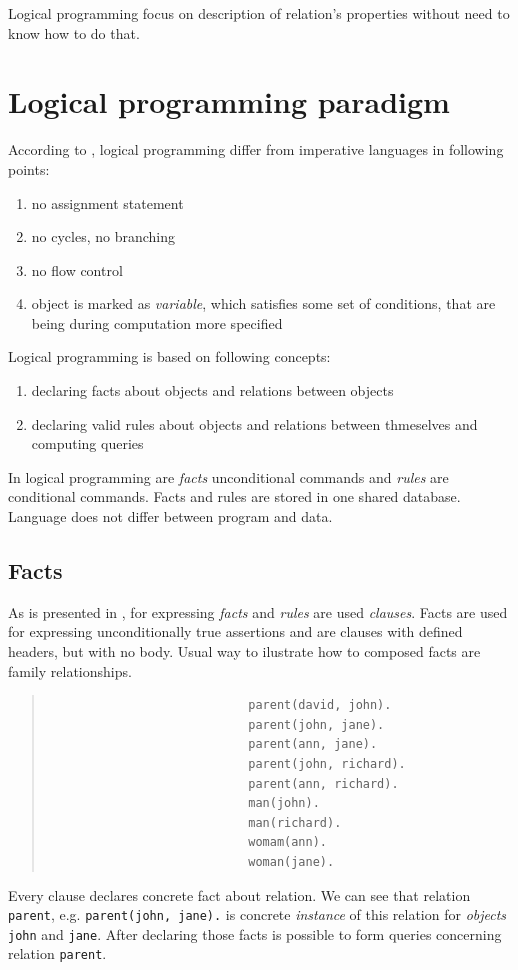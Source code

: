 \documentclass[11pt,twoside,a4paper]{book}
\begin{document}
Logical programming focus on description of relation's properties without need
to know how to do that.

\section{Logical programming paradigm}

According to \cite{nino:pls}, logical programming differ from imperative
languages in following points:
\begin{enumerate}
  \item no assignment statement
  \item no cycles, no branching 
  \item no flow control
  \item object is marked as \textit{variable}, which satisfies some set of
  conditions, that are being during computation more specified
\end{enumerate}
Logical programming is based on following concepts:
\begin{enumerate}
  \item declaring facts about objects and relations between objects
  \item declaring valid rules about objects and relations between thmeselves and
  computing queries
\end{enumerate}
In logical programming are \textit{facts} unconditional commands and
\textit{rules} are conditional commands. Facts and rules are stored in one
shared database. Language does not differ between program and data.

\newpage
\subsection{Facts}
\label{sec:facts}
As is presented in \cite{jirku:progProlog}, for expressing \textit{facts} and
\textit{rules} are used \textit{clauses}. Facts are used for expressing unconditionally true assertions and are clauses
with defined headers, but with no body. Usual way to ilustrate how to
composed facts are family relationships.

\begin{quote}
\begin{verbatim}
                            parent(david, john).
                            parent(john, jane).
                            parent(ann, jane).
                            parent(john, richard).
                            parent(ann, richard).
                            man(john).
                            man(richard).
                            womam(ann).
                            woman(jane).
\end{verbatim}
\end{quote}
Every clause declares concrete fact about relation. We can see that relation
\verb|parent|, e.g. \verb|parent(john, jane).| is concrete \textit{instance} of
this relation for \textit{objects} \verb|john| and \verb|jane|. After declaring
those facts is possible to form queries concerning relation \verb|parent|.
\end{document}
